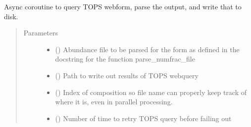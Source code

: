 \documentclass[letterpaper,10pt,english]{sphinxmanual}
\begin{document}
\begin{fulllineitems}
\label{\detokenize{pyTOPSScrape.api:pyTOPSScrape.api.api.query_and_parse}}
\sphinxAtStartPar
Async coroutine to query TOPS webform, parse the output, and write that
to disk.
\begin{quote}\begin{description}
\item[{Parameters}] \leavevmode\begin{itemize}
\item {} 
\sphinxAtStartPar
{} () \textendash{} Abundance file to be parsed for the form as defined in the docstring
for the function parse\_numfrac\_file

\item {} 
\sphinxAtStartPar
{} () \textendash{} Path to write out results of TOPS webquery

\item {} 
\sphinxAtStartPar
{} () \textendash{} Index of composition so file name can properly keep track of where
it is, even in parallel processing.

\item {} 
\sphinxAtStartPar
{} (\sphinxstyleliteralemphasis{\sphinxupquote{, }}) \textendash{} Number of time to retry TOPS query before failing out

\end{itemize}

\end{description}\end{quote}

\end{fulllineitems}

\end{document}
